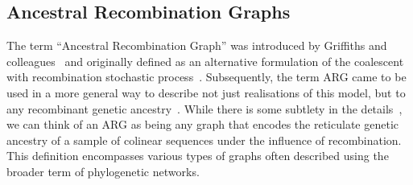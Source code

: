 \documentclass{article}
\begin{document}


\subsection{Ancestral Recombination Graphs}
\label{sec:args}
The term ``Ancestral Recombination Graph'' was introduced by
Griffiths and colleagues~\citep{Griffiths1991-two,Griffiths1998-ancestral}
and originally defined as an alternative formulation of the coalescent
with recombination stochastic process~\citep{Hudson1983-properties}.
Subsequently, the term ARG came to be used in a more general way to
describe not just realisations of this model, but to any
recombinant genetic ancestry~\citep{Minichiello2006-mapping,Zhang2023-lf}.
While there is some subtlety in the details~\citep{Wong2023-efficient},
we can think of an ARG as being any graph that encodes the
reticulate genetic ancestry of a sample of colinear sequences under
the influence of recombination.
This definition encompasses various types of graphs often
described using the broader term of phylogenetic networks.
\end{document}
